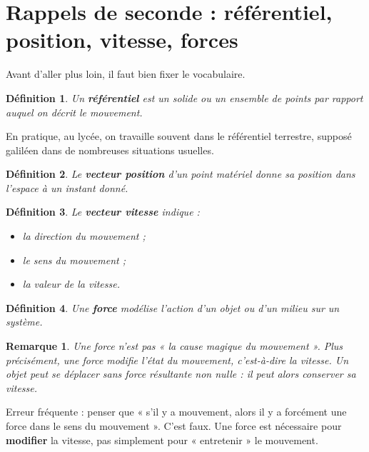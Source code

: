 \documentclass[11pt,a4paper]{article}
\newtheorem{definition}{Définition}[section]
\newtheorem{remarque}{Remarque}[section]
\begin{document}
\section{Rappels de seconde : référentiel, position, vitesse, forces}

Avant d'aller plus loin, il faut bien fixer le vocabulaire.

\begin{definition}
Un \textbf{référentiel} est un solide ou un ensemble de points par rapport auquel on décrit le mouvement.
\end{definition}

En pratique, au lycée, on travaille souvent dans le référentiel terrestre, supposé galiléen dans de nombreuses situations usuelles.

\begin{definition}
Le \textbf{vecteur position} d'un point matériel donne sa position dans l'espace à un instant donné.
\end{definition}

\begin{definition}
Le \textbf{vecteur vitesse} indique :
\begin{itemize}
    \item la direction du mouvement ;
    \item le sens du mouvement ;
    \item la valeur de la vitesse.
\end{itemize}
\end{definition}

\begin{definition}
Une \textbf{force} modélise l'action d'un objet ou d'un milieu sur un système.
\end{definition}

\begin{remarque}
Une force n'est pas « la cause magique du mouvement ». Plus précisément, une force modifie l'état du mouvement, c'est-à-dire la vitesse.  
Un objet peut se déplacer sans force résultante non nulle : il peut alors conserver sa vitesse.
\end{remarque}

\begin{attentionbox}
Erreur fréquente : penser que « s'il y a mouvement, alors il y a forcément une force dans le sens du mouvement ».  
C'est faux. Une force est nécessaire pour \textbf{modifier} la vitesse, pas simplement pour « entretenir » le mouvement.
\end{attentionbox}
\end{document}
